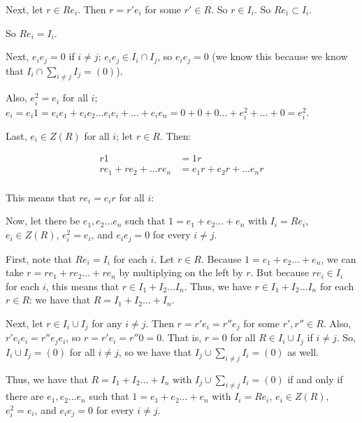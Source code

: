\documentclass[a4paper,12pt]{article}
\newcommand{\tab}{\hspace{4mm}} %
\newcommand{\shunt}{\vspace{20mm}}
\begin{document}
\tab \tab Next, let $r \in Re_i$. Then $r = r'e_i$ for some $r' \in R$. So $r \in I_i$. So $Re_i \subset I_i$.

\tab \tab So $Re_i = I_i$.

\tab Next, $e_ie_j = 0$ if $i \neq j$; $e_ie_j \in I_i \cap I_j$, so $e_ie_j = 0$ (we know this because we know that $I_i \cap \sum\limits_{i \neq j} I_j = (0)$).

\tab Also, $e_i^2 = e_i$ for all $i$; $e_i = e_i1= e_ie_1+e_ie_2 \ldots e_ie_i +\ldots + e_ie_n = 0+0+0\ldots+e_i^2+\ldots+0 = e_i^2$. 

\tab Last, $e_i \in Z(R)$ for all $i$; let $r \in R$. Then:

\begin{align*}
r1&=1r\\
re_1+re_2+\ldots re_n &=e_1r+e_2r+\ldots e_nr\\
\end{align*}

\tab This means that $re_i=e_ir$ for all $i$: %

Now, let there be $e_1, e_2 \ldots e_n$ such that $1 = e_1 + e_2 \ldots +e_n$ with $I_i = Re_i$, $e_i \in Z(R)$, $e_i^2 = e_i$, and $e_ie_j = 0$ for every $i \neq j$.

\tab First, note that $Re_i = I_i$ for each $i$. Let $r \in R$. Because $1 = e_1 + e_2 \ldots +e_n$, we can take $r =re_1 + re_2 \ldots + re_n$ by multiplying on the left by $r$. But because $re_i \in I_i$ for each $i$, this means that $r \in I_1 + I_2 \ldots I_n$. Thus, we have $r \in I_1 + I_2 \ldots I_n$ for each $r \in R$: we have that $R = I_1 + I_2 \ldots +I_n$.

\tab Next, let $r \in I_i \cup I_j$ for any $i \neq j$. Then $r = r'e_i=r''e_j$ for some $r',r'' \in R$. Also, $r'e_ie_i=r''e_je_i$, so $r=r'e_i = r''0=0$. That is, $r=0$ for all $R \in I_i \cup I_j$ if $i \neq j$. So, $I_i \cup I_j = (0)$ for all $i \neq j$, so we have that $I_j \cup \sum\limits_{i \neq j} I_i = (0)$ as well.

Thus, we have that $R = I_1 +I_2 \ldots + I_n$ with $I_j \cup \sum\limits_{i \neq j} I_i = (0)$ if and only if there are $e_1, e_2 \ldots e_n$ such that $1 = e_1 + e_2 \ldots +e_n$ with $I_i = Re_i$, $e_i \in Z(R)$, $e_i^2 = e_i$, and $e_ie_j = 0$ for every $i \neq j$.

\shunt
\end{document}
